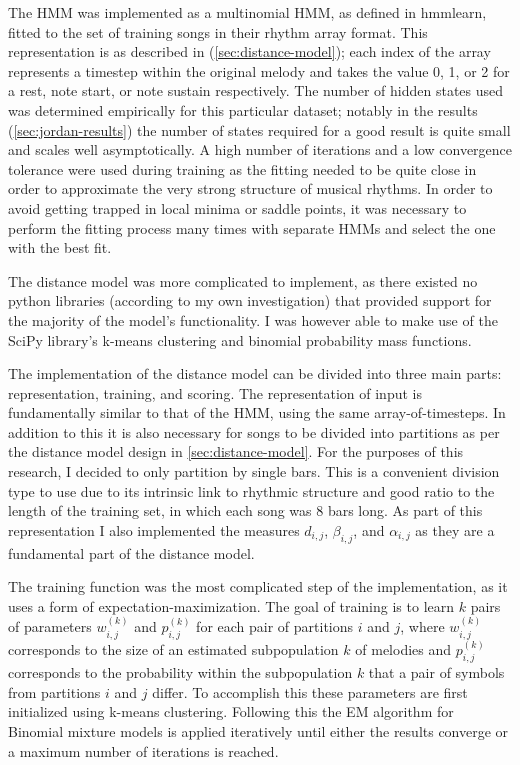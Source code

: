 \documentclass[ author={Stephen Livermore-Tozer},
				supervisor={Dr. Peter Flach},
				degree={MEng},
				title={Performing Algorithmic Co-composition Using Machine Learning},
				subtitle={},
				type={research},
				year={2016} ]{dissertation}
\begin{document}
	The HMM was implemented as a multinomial HMM, as defined in hmmlearn, fitted to the set of training songs in their rhythm array format. This representation is as described in (\ref{sec:distance-model}); each index of the array represents a timestep within the original melody and takes the value 0, 1, or 2 for a rest, note start, or note sustain respectively. The number of hidden states used was determined empirically for this particular dataset; notably in the results (\ref{sec:jordan-results}) the number of states required for a good result is quite small and scales well asymptotically. A high number of iterations and a low convergence tolerance were used during training as the fitting needed to be quite close in order to approximate the very strong structure of musical rhythms. In order to avoid getting trapped in local minima or saddle points, it was necessary to perform the fitting process many times with separate HMMs and select the one with the best fit.
	
	The distance model was more complicated to implement, as there existed no python libraries (according to my own investigation) that provided support for the majority of the model's functionality. I was however able to make use of the SciPy library's k-means clustering and binomial probability mass functions. 
	
	The implementation of the distance model can be divided into three main parts: representation, training, and scoring. The representation of input is fundamentally similar to that of the HMM, using the same array-of-timesteps. In addition to this it is also necessary for songs to be divided into partitions as per the distance model design in \ref{sec:distance-model}. For the purposes of this research, I decided to only partition by single bars. This is a convenient division type to use due to its intrinsic link to rhythmic structure and good ratio to the length of the training set, in which each song was 8 bars long. As part of this representation I also implemented the measures $d_{i,j}$, $\beta_{i,j}$, and $\alpha_{i,j}$ as they are a fundamental part of the distance model.
	
	The training function was the most complicated step of the implementation, as it uses a form of expectation-maximization. The goal of training is to learn $k$ pairs of parameters $w^{(k)}_{i,j}$ and $p^{(k)}_{i,j}$ for each pair of partitions $i$ and $j$, where $w^{(k)}_{i,j}$ corresponds to the size of an estimated subpopulation $k$ of melodies and $p^{(k)}_{i,j}$ corresponds to the probability within the subpopulation $k$ that a pair of symbols from partitions $i$ and $j$ differ. To accomplish this these parameters are first initialized using k-means clustering. Following this the EM algorithm for Binomial mixture models \cite{bilmes1998gentle} is applied iteratively until either the results converge or a maximum number of iterations is reached. 
	
\end{document}
